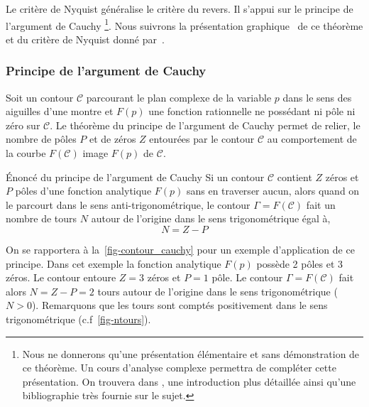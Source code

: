 Le critère de Nyquist généralise le critère du revers.
Il s'appui sur le principe de l'argument de Cauchy
\footnote{Nous ne donnerons qu'une présentation élémentaire et sans 
démonstration de ce théorème. Un cours d'analyse complexe permettra de 
compléter cette présentation. On trouvera dans \cite{laas_pc7bis,reg}, 
une introduction plus détaillée ainsi qu'une bibliographie très fournie 
sur le sujet.}. Nous suivrons la présentation \og graphique\fg~ de ce théorème 
et du critère de Nyquist donné par~\cite{reg}. 

\subsubsection{Principe de l'argument de Cauchy}

Soit un contour $\mathcal{C}$ parcourant le plan complexe de 
la variable $p$ dans le sens des aiguilles d'une montre et $F(p)$ une fonction 
rationnelle ne possédant ni pôle ni zéro sur $\mathcal{C}$. Le théorème du 
principe de l'argument de Cauchy permet de relier, le nombre de pôles $P$ et 
de zéros $Z$ entourées par le contour $\mathcal{C}$ au comportement de la 
courbe $F(\mathcal{C})$ image $F(p)$ de $\mathcal{C}$.

\begin{theorem}{\'Enoncé du principe de l'argument de Cauchy} 
    Si un contour $\mathcal{C}$ contient $Z$ zéros et $P$ pôles d'une fonction 
    analytique $F(p)$ sans en traverser aucun, alors quand on le parcourt dans 
    le sens anti-trigonométrique, le contour $\Gamma=F(\mathcal{C})$ fait un 
    nombre de tours $N$ autour de l'origine dans le sens trigonométrique égal 
    à,
    $$
    N=Z-P
    $$
\end{theorem}

On se rapportera à la~\cref{fig-contour_cauchy} pour un exemple d'application 
de ce principe. Dans cet exemple la fonction analytique $F(p)$ possède 2 pôles 
et 3 zéros. Le contour entoure $Z=3$ zéros et $P=1$ pôle.
Le contour $\Gamma=F(\mathcal{C})$ fait alors $N=Z-P=2$ tours autour 
de l'origine dans le sens trigonométrique ($N>0$). Remarquons que les tours 
sont comptés positivement dans le sens trigonométrique (c.f~\cref{fig-ntours}).

